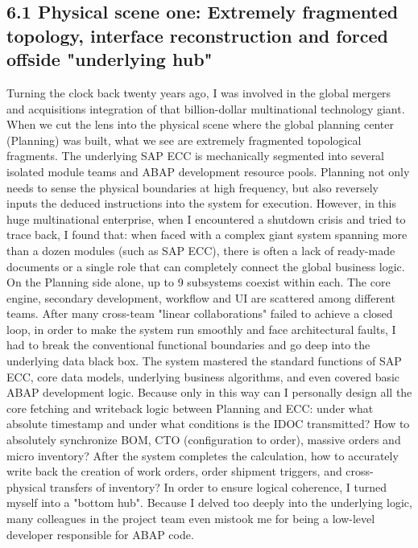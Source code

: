 \documentclass[11pt,a4paper]{article}
\begin{document}
\subsection*{6.1 Physical scene one: Extremely fragmented topology, interface reconstruction and forced offside "underlying hub"}


Turning the clock back twenty years ago, I was involved in the global mergers and acquisitions integration of that billion-dollar multinational technology giant. When we cut the lens into the physical scene where the global planning center (Planning) was built, what we see are extremely fragmented topological fragments. The underlying SAP ECC is mechanically segmented into several isolated module teams and ABAP development resource pools. Planning not only needs to sense the physical boundaries at high frequency, but also reversely inputs the deduced instructions into the system for execution. However, in this huge multinational enterprise, when I encountered a shutdown crisis and tried to trace back, I found that: when faced with a complex giant system spanning more than a dozen modules (such as SAP ECC), there is often a lack of ready-made documents or a single role that can completely connect the global business logic. On the Planning side alone, up to 9 subsystems coexist within each. The core engine, secondary development, workflow and UI are scattered among different teams. After many cross-team "linear collaborations" failed to achieve a closed loop, in order to make the system run smoothly and face architectural faults, I had to break the conventional functional boundaries and go deep into the underlying data black box. The system mastered the standard functions of SAP ECC, core data models, underlying business algorithms, and even covered basic ABAP development logic. Because only in this way can I personally design all the core fetching and writeback logic between Planning and ECC: under what absolute timestamp and under what conditions is the IDOC transmitted? How to absolutely synchronize BOM, CTO (configuration to order), massive orders and micro inventory? After the system completes the calculation, how to accurately write back the creation of work orders, order shipment triggers, and cross-physical transfers of inventory? In order to ensure logical coherence, I turned myself into a "bottom hub". Because I delved too deeply into the underlying logic, many colleagues in the project team even mistook me for being a low-level developer responsible for ABAP code.
\end{document}
